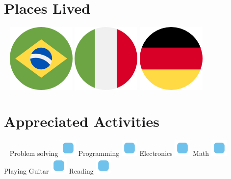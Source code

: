 \documentclass[]{friggeri-cv}
\begin{document}
\begin{aside}
	\section{Places Lived}
		~
		\includegraphics[scale=0.03]{img/brazil.png}    \includegraphics[scale=0.03]{img/italy.png}   \includegraphics[scale=0.03]{img/germany.png}
    	~
    \section{Appreciated Activities}
    	~
	    Problem solving \includegraphics[scale=0.40]{img/point.png}
	    Programming \includegraphics[scale=0.40]{img/point.png}
	    Electronics \includegraphics[scale=0.40]{img/point.png}
	    Math \includegraphics[scale=0.40]{img/point.png}
	    Playing Guitar \includegraphics[scale=0.40]{img/point.png}
	    Reading \includegraphics[scale=0.40]{img/point.png}
	    ~ 
\end{aside}
~
\end{document}
